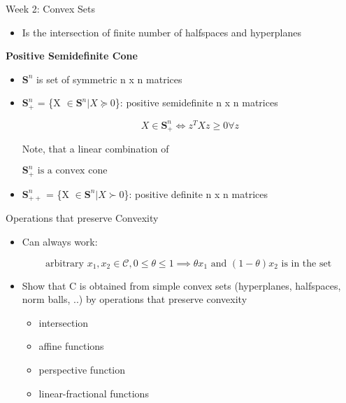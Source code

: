 \documentclass{article}
\begin{document}
\begin{homeworkProblemName}{{\LARGE Week 2: Convex Sets}}
\begin{problemAnswer}
{\begin{itemize}
        Ax $\prec$ b, Cx = d

        \[\text{Where } A \in \bm{R}^{m x n}, C \in \bm{R}^{p x n}, \text{ and } \prec
         \text{ is componentwise inequality}\]

      \item Is the intersection of finite number of halfspaces and hyperplanes
      \end{itemize}
    }\end{problemAnswer}


  \vspace{0.2 cm} \textbf{\large Positive Semidefinite Cone}

  \begin{problemAnswer}{
      \begin{itemize}
      \item $\bm{S}^n$ is set of symmetric n x n matrices
      \item $\bm{S}^n_+$ = \{X $\in \bm{S}^n | X \succeq 0$\}: positive semidefinite n x
        n matrices

        \[X \in \bm{S}^n_+ \iff z^TXz \geq 0 \forall z\]

        Note, that a linear combination of 

        $\bm{S}^n_+ \text{ is a convex cone} $

      \item $\bm{S}^n_{++}$ = \{X $\in \bm{S}^n | X \succ 0$\}: positive definite n x
        n matrices
      \end{itemize}
    }\end{problemAnswer}

  \clearpage

  {\Large Operations that preserve Convexity}
  

  \begin{problemAnswer}{
      \begin{itemize}
      \item Can always work:

        \[\text{arbitrary } x_1,  x_2 \in \mathcal{C}, 0 \leq \theta \leq  1 \implies \theta x_1 \text{ and } (1 - \theta)x_2 \text{ is in the set }\]
        
      \item Show that C is obtained from simple convex sets (hyperplanes,
        halfspaces, norm balls, ..) by operations that preserve convexity
        \begin{itemize}
        \item intersection
        \item affine functions
        \item perspective function
        \item linear-fractional functions
        \end{itemize}
      \end{itemize}
    }\end{problemAnswer}  


\end{homeworkProblemName}
\end{document}
